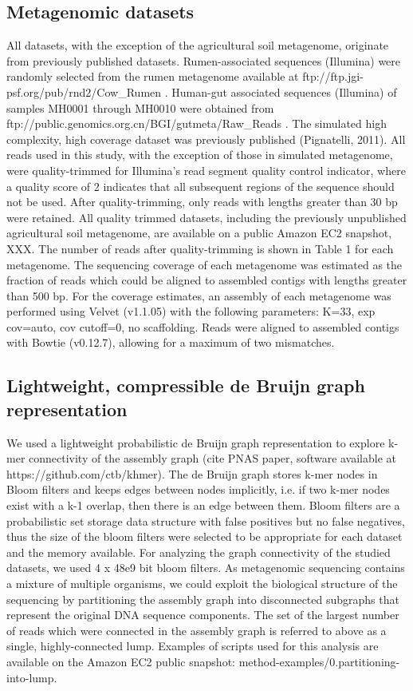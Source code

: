 \documentclass[11pt]{article} %
\begin{document}
\subsection{Metagenomic datasets}
All datasets, with the exception of the agricultural soil metagenome, originate from previously published datasets. Rumen-associated sequences (Illumina) were randomly selected from the rumen metagenome available at ftp://ftp.jgi-psf.org/pub/rnd2/Cow\_Rumen \cite{Hess:2011p686}. Human-gut associated sequences (Illumina) of samples MH0001 through MH0010 were obtained from ftp://public.genomics.org.cn/BGI/gutmeta/Raw\_Reads \cite{Qin:2010p189}.  The simulated high complexity, high coverage dataset was previously published (Pignatelli, 2011).  All reads used in this study, with the exception of those in simulated metagenome, were quality-trimmed for Illumina's read segment quality control indicator, where a quality score of 2 indicates that all subsequent regions of the sequence should not be used. After quality-trimming, only reads with lengths greater than 30 bp were retained. All quality trimmed datasets, including the previously unpublished agricultural soil metagenome, are available on a public Amazon EC2 snapshot, XXX.   The number of reads after quality-trimming is shown in Table 1 for each metagenome.  The sequencing coverage of each metagenome was estimated as the fraction of reads which could be aligned to assembled contigs with lengths greater than 500 bp.  For the coverage estimates, an assembly of each metagenome was performed using Velvet (v1.1.05) with the following parameters:  K=33, exp cov=auto, cov cutoff=0, no scaffolding.  Reads were aligned to assembled contigs with Bowtie (v0.12.7), allowing for a maximum of two mismatches.  

\subsection{Lightweight, compressible de Bruijn graph representation}
We used a lightweight probabilistic de Bruijn graph representation to explore k-mer connectivity of the assembly graph (cite PNAS paper, software available at https://github.com/ctb/khmer). The de Bruijn graph stores k-mer nodes in Bloom filters and keeps edges between nodes implicitly, i.e. if two k-mer nodes exist with a k-1 overlap, then there is an edge between them. Bloom filters are a probabilistic set storage data structure with false positives but no false negatives, thus the size of the bloom filters were selected to be appropriate for each dataset and the memory available.  For analyzing the graph connectivity of the studied datasets, we used 4 x 48e9 bit bloom filters.  As metagenomic sequencing contains a mixture of multiple organisms, we could exploit the biological structure of the sequencing by partitioning the assembly graph into disconnected subgraphs that represent the original DNA sequence components. The set of the largest number of reads which were connected in the assembly graph is referred to above as a single, highly-connected lump.  Examples of scripts used for this analysis are available on the Amazon EC2 public snapshot:  method-examples/0.partitioning-into-lump.
\end{document}
